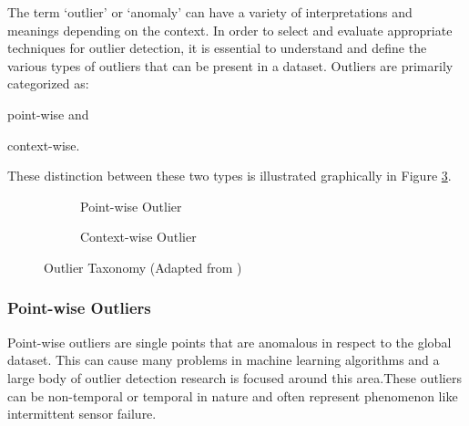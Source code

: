 The term `outlier' or `anomaly' can have a variety of interpretations and meanings depending on the context. In order to select and evaluate appropriate techniques for outlier detection, it is essential to understand and define the various types of outliers that can be present in a dataset. Outliers are primarily categorized as:
\begin{inlinelist}
    \item point-wise and
    \item context-wise.
\end{inlinelist}
These distinction between these two types is illustrated graphically in Figure \ref{fig:outliers-graphic}.


\begin{figure}[H]
     \centering
     \begin{subfigure}[b]{0.475\textwidth}
         \centering
         {\resizebox{\textwidth}{!}{}}
         \caption{Point-wise Outlier}
         \label{fig:point}
     \end{subfigure}
     \hfill
     \begin{subfigure}[b]{0.475\textwidth}
         \centering
          {\resizebox{\textwidth}{!}{}}
         \caption{Context-wise Outlier}
         \label{fig:contextual}
     \end{subfigure}
        \caption{Outlier Taxonomy (Adapted from \cite{lai2021revisiting})}
        \label{fig:outliers-graphic}
\end{figure}

\subsubsection{Point-wise Outliers}

Point-wise outliers are single points that are anomalous in respect to the global dataset. This can cause many problems in machine learning algorithms and a large body of outlier detection research is focused around this area.These outliers can be non-temporal or temporal in nature and often represent phenomenon like intermittent sensor failure.

